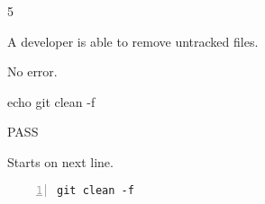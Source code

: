 \begin{description}[align=right,leftmargin=3.2cm,labelindent=3.0cm]
\item[Step:] 5
\item[Confirm:] A developer is able to remove untracked files.
\item[Expectation:] No error.
\item[Command:] echo git  clean -f
\item[Test Result:] PASS
\item[Evidence:] Starts on next line.
\end{description}
\begin{lstlisting}[numbers=left]
git clean -f

\end{lstlisting}
